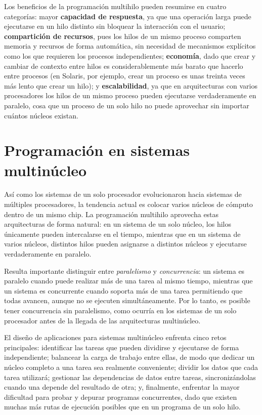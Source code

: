 \documentclass[12pt,letterpaper]{article}
\begin{document}
Los beneficios de la programación multihilo pueden resumirse en cuatro categorías: mayor \textbf{capacidad de respuesta}, ya que una operación larga puede ejecutarse en un hilo distinto sin bloquear la interacción con el usuario; \textbf{compartición de recursos}, pues los hilos de un mismo proceso comparten memoria y recursos de forma automática, sin necesidad de mecanismos explícitos como los que requieren los procesos independientes; \textbf{economía}, dado que crear y cambiar de contexto entre hilos es considerablemente más barato que hacerlo entre procesos (en Solaris, por ejemplo, crear un proceso es unas treinta veces más lento que crear un hilo); y \textbf{escalabilidad}, ya que en arquitecturas con varios procesadores los hilos de un mismo proceso pueden ejecutarse verdaderamente en paralelo, cosa que un proceso de un solo hilo no puede aprovechar sin importar cuántos núcleos existan.

\section{Programación en sistemas multinúcleo}

Así como los sistemas de un solo procesador evolucionaron hacia sistemas de múltiples procesadores, la tendencia actual es colocar varios núcleos de cómputo dentro de un mismo chip. La programación multihilo aprovecha estas arquitecturas de forma natural: en un sistema de un solo núcleo, los hilos únicamente pueden intercalarse en el tiempo, mientras que en un sistema de varios núcleos, distintos hilos pueden asignarse a distintos núcleos y ejecutarse verdaderamente en paralelo.

Resulta importante distinguir entre \textit{paralelismo} y \textit{concurrencia}: un sistema es paralelo cuando puede realizar más de una tarea al mismo tiempo, mientras que un sistema es concurrente cuando soporta más de una tarea permitiendo que todas avancen, aunque no se ejecuten simultáneamente. Por lo tanto, es posible tener concurrencia sin paralelismo, como ocurría en los sistemas de un solo procesador antes de la llegada de las arquitecturas multinúcleo.

El diseño de aplicaciones para sistemas multinúcleo enfrenta cinco retos principales: identificar las tareas que pueden dividirse y ejecutarse de forma independiente; balancear la carga de trabajo entre ellas, de modo que dedicar un núcleo completo a una tarea sea realmente conveniente; dividir los datos que cada tarea utilizará; gestionar las dependencias de datos entre tareas, sincronizándolas cuando una depende del resultado de otra; y, finalmente, enfrentar la mayor dificultad para probar y depurar programas concurrentes, dado que existen muchas más rutas de ejecución posibles que en un programa de un solo hilo.
\end{document}
